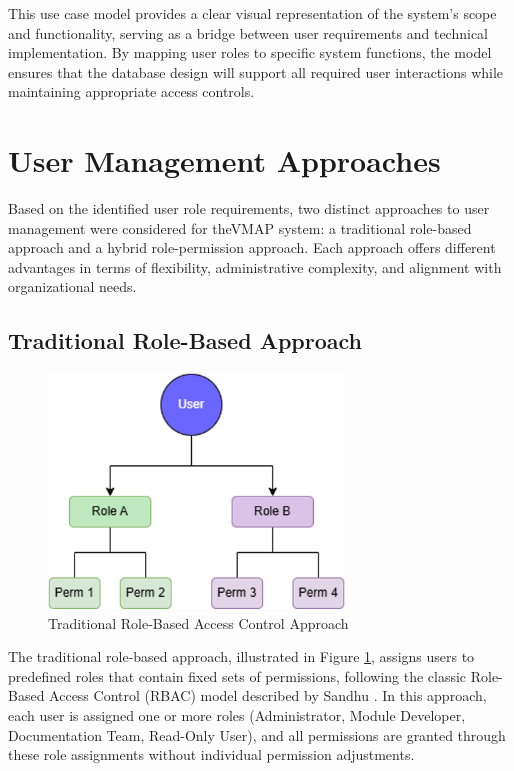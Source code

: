 This use case model provides a clear visual representation of the system's scope and functionality, serving as a bridge between user requirements and technical implementation. By mapping user roles to specific system functions, the model ensures that the database design will support all required user interactions while maintaining appropriate access controls.

\section{User Management Approaches}
\label{sec:user-management-approaches}

Based on the identified user role requirements, two distinct approaches to user management were considered for the\ac{VMAP} system: a traditional role-based approach and a hybrid role-permission approach. Each approach offers different advantages in terms of flexibility, administrative complexity, and alignment with organizational needs.

\subsection{Traditional Role-Based Approach}
\label{subsec:traditional-role-approach}

\begin{figure}[h]
    \centering
    \includegraphics[width=0.7\textwidth]{figures/traditional_rbac_model.png}
    \caption{Traditional Role-Based Access Control Approach}
    \label{fig:traditional-rbac}
\end{figure}

The traditional role-based approach, illustrated in Figure \ref{fig:traditional-rbac}, assigns users to predefined roles that contain fixed sets of permissions, following the classic Role-Based Access Control (RBAC) model described by Sandhu \cite{sandhu1998role}. In this approach, each user is assigned one or more roles (Administrator, Module Developer, Documentation Team, Read-Only User), and all permissions are granted through these role assignments without individual permission adjustments.

